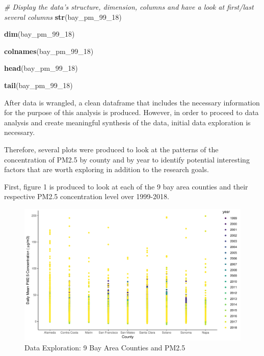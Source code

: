 \documentclass[12pt,]{article}
\newenvironment{Shaded}{\begin{snugshade}}{\end{snugshade}}
\newcommand{\KeywordTok}[1]{\textcolor[rgb]{0.13,0.29,0.53}{\textbf{#1}}}
\newcommand{\DecValTok}[1]{\textcolor[rgb]{0.00,0.00,0.81}{#1}}
\newcommand{\CommentTok}[1]{\textcolor[rgb]{0.56,0.35,0.01}{\textit{#1}}}
\newcommand{\NormalTok}[1]{#1}
\begin{document}
\begin{Shaded}
\begin{Highlighting}[]
\CommentTok{# Display the data's structure, dimension, columns and have a look at first/last several columns}
\KeywordTok{str}\NormalTok{(bay_pm_99_}\DecValTok{18}\NormalTok{)}

\KeywordTok{dim}\NormalTok{(bay_pm_99_}\DecValTok{18}\NormalTok{)}

\KeywordTok{colnames}\NormalTok{(bay_pm_99_}\DecValTok{18}\NormalTok{)}

\KeywordTok{head}\NormalTok{(bay_pm_99_}\DecValTok{18}\NormalTok{)}

\KeywordTok{tail}\NormalTok{(bay_pm_99_}\DecValTok{18}\NormalTok{)}
\end{Highlighting}
\end{Shaded}

\newpage

After data is wrangled, a clean dataframe that includes the necessary
information for the purpose of this analysis is produced. However, in
order to proceed to data analysis and create meaningful synthesis of the
data, initial data exploration is necessary.

Therefore, several plots were produced to look at the patterns of the
concentration of PM2.5 by county and by year to identify potential
interesting factors that are worth exploring in addition to the research
goals.

First, figure 1 is produced to look at each of the 9 bay area counties
and their respective PM2.5 concentration level over 1999-2018.

\begin{figure}
\centering
\includegraphics{pm25_files/figure-latex/explore1-1.pdf}
\caption{Data Exploration: 9 Bay Area Counties and PM2.5}
\end{figure}
\end{document}

